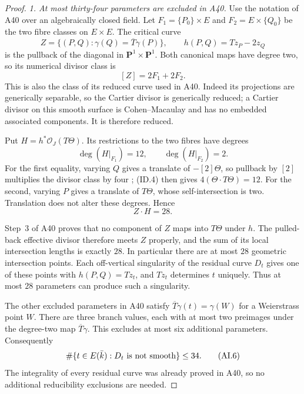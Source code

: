 \begin{proof}
\emph{1. At most thirty-four parameters are excluded in A40.}
Use the notation of A40 over an algebraically closed field.
Let $F_1=\{P_0\}\times E$ and $F_2=E\times\{Q_0\}$ be
the two fibre classes on $E\times E$. The critical curve
\[
 Z=\{(P,Q):\gamma(Q)=\overline T\gamma(P)\},
         \qquad h(P,Q)=Tz_P-2z_Q
 \tag{AI.2}
\]
is the pullback of the diagonal in $\mathbf P^1\times\mathbf P^1$.
Both canonical maps have degree two, so its numerical
divisor class is
\[
                             [Z]=2F_1+2F_2.
 \tag{AI.3}
\]
This is also the class of its reduced curve used in A40.
Indeed its projections are generically separable, so the
Cartier divisor is generically reduced; a Cartier divisor
on this smooth surface is Cohen--Macaulay and has no
embedded associated components. It is therefore reduced.

Put $H=h^*\mathcal O_J(T\Theta)$. Its restrictions to the
two fibres have degrees
\[
                         \deg(H|_{F_1})=12,
                \qquad \deg(H|_{F_2})=2.
 \tag{AI.4}
\]
For the first equality, varying $Q$ gives a translate of
$-[2]\Theta$, so pullback by $[2]$ multiplies the divisor
class by four \cite[Corollary~6.6 and Remark~12.13,
pp.~9 and~24]{MilneAV}; (ID.4) then gives
$4(\Theta\cdot T\Theta)=12$.
For the second, varying $P$ gives a translate of $T\Theta$,
whose self-intersection is two. Translation does not alter
these degrees. Hence
\[
                             Z\cdot H=28.
 \tag{AI.5}
\]

Step~3 of A40 proves that no component of $Z$ maps into
$T\Theta$ under $h$. The pulled-back effective divisor
therefore meets $Z$ properly, and the sum of its local
intersection lengths is exactly $28$. In particular there
are at most $28$ geometric intersection points. Each
off-vertical singularity of the residual curve $D_t$ gives
one of these points with $h(P,Q)=Tz_t$, and $Tz_t$
determines $t$ uniquely. Thus at most $28$ parameters can
produce such a singularity.

The other excluded parameters in A40 satisfy
$\overline T\gamma(t)=\gamma(W)$ for a Weierstrass point
$W$. There are three branch values, each with at most two
preimages under the degree-two map $\overline T\gamma$.
This excludes at most six additional parameters. Consequently
\[
        \#\{t\in E(\bar k):D_t\hbox{ is not smooth}\}\le34.
 \tag{AI.6}
\]
The integrality of every residual curve was already proved
in A40, so no additional reducibility exclusions are needed.


\end{proof}
